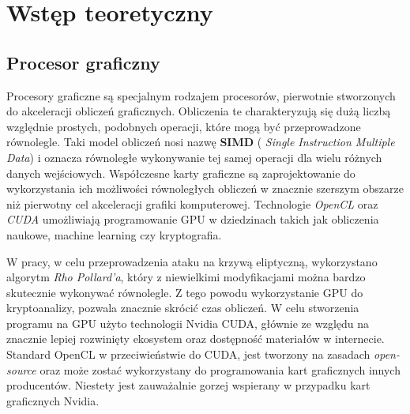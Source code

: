 \newpage
\section{Wstęp teoretyczny}

\subsection{Procesor graficzny}
Procesory graficzne są specjalnym rodzajem procesorów,
pierwotnie stworzonych do akceleracji obliczeń graficznych.
Obliczenia te charakteryzują się dużą liczbą względnie prostych, podobnych operacji,
które mogą być przeprowadzone równolegle.
Taki model obliczeń nosi nazwę \textbf{SIMD} ( \textit{Single Instruction Multiple Data})
i oznacza równoległe wykonywanie tej samej operacji dla wielu różnych danych wejściowych.
Współczesne karty graficzne są zaprojektowanie do wykorzystania
ich możliwości równoległych obliczeń w znacznie szerszym obszarze niż
pierwotny cel akceleracji grafiki komputerowej.
Technologie \textit{OpenCL} oraz \textit{CUDA} umożliwiają
programowanie GPU w
dziedzinach takich jak obliczenia naukowe, machine learning czy kryptografia.

\par
W pracy, w celu przeprowadzenia ataku na krzywą eliptyczną, wykorzystano
algorytm \textit{Rho Pollard'a}, który z niewielkimi modyfikacjami można bardzo skutecznie wykonywać
równolegle. Z tego powodu wykorzystanie GPU do kryptoanalizy, pozwala znacznie skrócić czas
obliczeń. W celu stworzenia programu na GPU użyto technologii Nvidia CUDA, głównie ze względu
na znacznie lepiej rozwinięty ekosystem oraz dostępność materiałów w internecie.
Standard OpenCL w przeciwieństwie do CUDA, jest tworzony na zasadach \textit{open-source} oraz może zostać
wykorzystany do programowania kart graficznych innych producentów. Niestety jest zauważalnie
gorzej wspierany w przypadku kart graficznych Nvidia.
\par
